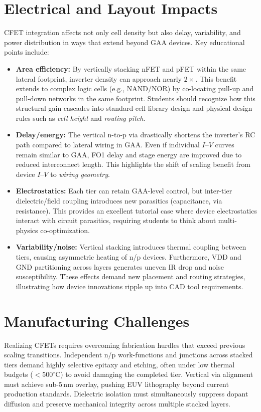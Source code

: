 \documentclass[conference]{IEEEtran}
\begin{document}
\section{Electrical and Layout Impacts}
CFET integration affects not only cell density but also delay,
variability, and power distribution in ways that extend beyond GAA devices.
Key educational points include:
\begin{itemize}
  \item \textbf{Area efficiency:} By vertically stacking nFET and pFET within the same lateral footprint, inverter density can approach nearly $2\times$.
  This benefit extends to complex logic cells (e.g., NAND/NOR) by co-locating pull-up and pull-down networks in the same footprint.
  Students should recognize how this structural gain cascades into standard-cell library design and physical design rules such as \emph{cell height} and \emph{routing pitch}.
  \item \textbf{Delay/energy:} The vertical n-to-p via drastically shortens the inverter’s RC path compared to lateral wiring in GAA.
  Even if individual $I$–$V$ curves remain similar to GAA, FO1 delay and stage energy are improved due to reduced interconnect length.
  This highlights the shift of scaling benefit from device $I$–$V$ to \emph{wiring geometry}.
  \item \textbf{Electrostatics:} Each tier can retain GAA-level control, but inter-tier dielectric/field coupling introduces new parasitics (capacitance, via resistance).
  This provides an excellent tutorial case where device electrostatics interact with circuit parasitics, requiring students to think about multi-physics co-optimization.
  \item \textbf{Variability/noise:} Vertical stacking introduces thermal coupling between tiers, causing asymmetric heating of n/p devices.
  Furthermore, VDD and GND partitioning across layers generates uneven IR drop and noise susceptibility.
  These effects demand new placement and routing strategies, illustrating how device innovations ripple up into CAD tool requirements.
\end{itemize}

\section{Manufacturing Challenges}
Realizing CFETs requires overcoming fabrication hurdles that exceed previous scaling transitions.
Independent n/p work-functions and junctions across stacked tiers demand highly selective epitaxy and etching,
often under low thermal budgets ($<500^{\circ}$C) to avoid damaging the completed tier.
Vertical via alignment must achieve sub-5\,nm overlay, pushing EUV lithography beyond current production standards.
Dielectric isolation must simultaneously suppress dopant diffusion and preserve mechanical integrity across multiple stacked layers.
\end{document}
